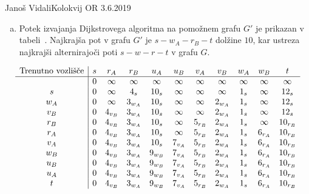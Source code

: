 \begin{naloga}{Janoš Vidali}{Kolokvij OR 3.6.2019}
\begin{odgovor}
\begin{enumerate}[(a)]
\item Potek izvajanja Dijkstrovega algoritma na pomožnem grafu $G'$
je prikazan v tabeli~\tab.
Najkrajša pot v grafu $G'$ je $s - w_A - r_B - t$ dolžine $10$,
kar ustreza najkrajši alternirajoči poti $s - w - r - t$ v grafu $G$.
\end{enumerate}
%
\begin{tabela}
$$
\begin{array}{c|cccccccccc}
\text{Trenutno vozlišče} &
s & r_A & r_B & u_A & u_B & v_A & v_B & w_A & w_B & t \\ \hline
& 0 & \infty & \infty & \infty & \infty & \infty & \infty & \infty & \infty & \infty \\
s & 0 & \infty & 4_s & 10_s & \infty & \infty & \infty & 1_s & \infty & 12_s \\
w_A & 0 & \infty & 3_{w_A} & 10_s & \infty & \infty & 2_{w_A} & 1_s & \infty & 12_s \\
v_B & 0 & 4_{v_B} & 3_{w_A} & 10_s & \infty & \infty & 2_{w_A} & 1_s & \infty & 12_s \\
r_B & 0 & 4_{v_B} & 3_{w_A} & 10_s & \infty & 5_{r_B} & 2_{w_A} & 1_s & \infty & 10_{r_B} \\
r_A & 0 & 4_{v_B} & 3_{w_A} & 10_s & \infty & 5_{r_B} & 2_{w_A} & 1_s & 6_{r_A} & 10_{r_B} \\
v_A & 0 & 4_{v_B} & 3_{w_A} & 10_s & 7_{v_A} & 5_{r_B} & 2_{w_A} & 1_s & 6_{r_A} & 10_{r_B} \\
w_B & 0 & 4_{v_B} & 3_{w_A} & 9_{w_B} & 7_{v_A} & 5_{r_B} & 2_{w_A} & 1_s & 6_{r_A} & 10_{r_B} \\
u_B & 0 & 4_{v_B} & 3_{w_A} & 9_{w_B} & 7_{v_A} & 5_{r_B} & 2_{w_A} & 1_s & 6_{r_A} & 10_{r_B} \\
u_A & 0 & 4_{v_B} & 3_{w_A} & 9_{w_B} & 7_{v_A} & 5_{r_B} & 2_{w_A} & 1_s & 6_{r_A} & 10_{r_B} \\
t & 0 & 4_{v_B} & 3_{w_A} & 9_{w_B} & 7_{v_A} & 5_{r_B} & 2_{w_A} & 1_s & 6_{r_A} & 10_{r_B} \\
\end{array}
$$
\end{tabela}
\end{odgovor}
\end{naloga}
